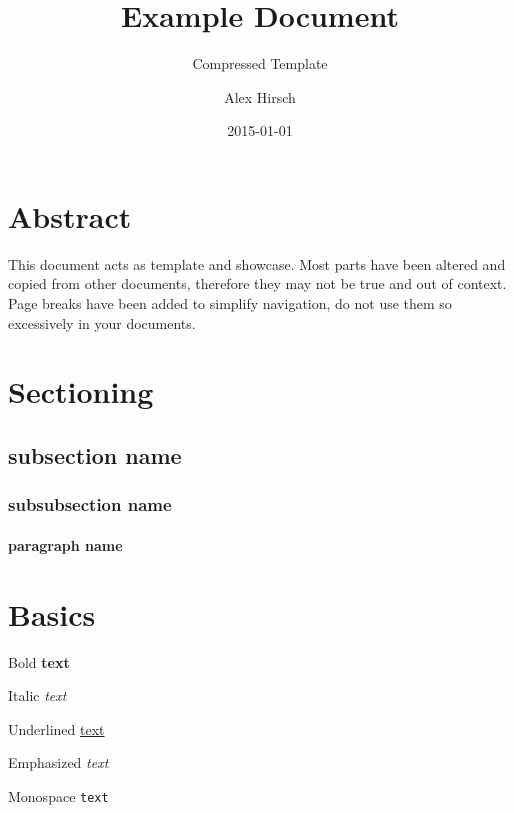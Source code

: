 \documentclass{uibk}
\title{Example Document}
\subtitle{Compressed Template}
\author{Alex Hirsch}
\date{2015-01-01}
\begin{document}
\maketitle

\section*{Abstract}
\label{sec:abstract}

This document acts as template and showcase. Most parts have been altered and
copied from other documents, therefore they may not be true and out of context.
Page breaks have been added to simplify navigation, do not use them so
excessively in your documents.

\section{Sectioning}
\label{sec:sectioning}

\lipsum[1]

\subsection{subsection name}
\label{sub:subsection_name}

\lipsum[2]

\lipsum[2]

\subsubsection{subsubsection name}
\label{ssub:subsubsection_name}

\lipsum[2]

\paragraph{paragraph name}
\label{par:paragraph_name}

\lipsum[2]

\newpage

\section{Basics}
\label{sec:basics}

Bold \textbf{text}

Italic \textit{text}

Underlined \underline{text}

Emphasized \emph{text}

Monospace \texttt{text}
\end{document}
